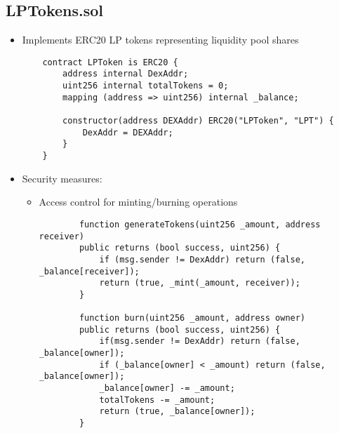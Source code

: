 \documentclass[12pt,a4paper]{article}
\begin{document}
\subsection*{LPTokens.sol}
\begin{itemize}
    \item Implements ERC20 LP tokens representing liquidity pool shares
    \begin{listing}[H]
    \begin{verbatim}
    contract LPToken is ERC20 {
        address internal DexAddr;
        uint256 internal totalTokens = 0;
        mapping (address => uint256) internal _balance;
        
        constructor(address DEXAddr) ERC20("LPToken", "LPT") {
            DexAddr = DEXAddr;
        }
    }
    \end{verbatim}
    \end{listing}

    \item Security measures:
    \begin{itemize}
        \item Access control for minting/burning operations
        \begin{listing}[H]
        \begin{verbatim}
        function generateTokens(uint256 _amount, address receiver) 
        public returns (bool success, uint256) {
            if (msg.sender != DexAddr) return (false, _balance[receiver]);
            return (true, _mint(_amount, receiver));
        }

        function burn(uint256 _amount, address owner) 
        public returns (bool success, uint256) {
            if(msg.sender != DexAddr) return (false, _balance[owner]);
            if (_balance[owner] < _amount) return (false, _balance[owner]);
            _balance[owner] -= _amount;
            totalTokens -= _amount;
            return (true, _balance[owner]);
        }
        \end{verbatim}
        \end{listing}
    \end{itemize}
\end{itemize}
\end{document}
